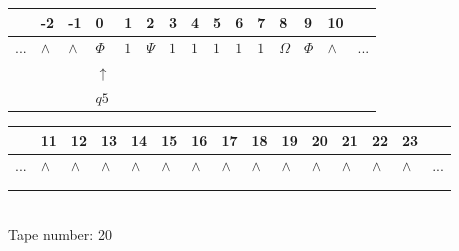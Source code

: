 \documentclass[11pt]{article}
\begin{document}
\begin{table}[H]
\centering
\begin{tabular}{lllllllllllllll}
 & -2 & -1 & 0 & 1 & 2 & 3 & 4 & 5 & 6 & 7 & 8 & 9 & 10 & \\
\hline
$...$ & \multicolumn{1}{|l|}{$\wedge$} & \multicolumn{1}{|l|}{$\wedge$} & \multicolumn{1}{|l|}{$\Phi$} & \multicolumn{1}{|l|}{$1$} & \multicolumn{1}{|l|}{$\Psi$} & \multicolumn{1}{|l|}{$1$} & \multicolumn{1}{|l|}{$1$} & \multicolumn{1}{|l|}{$1$} & \multicolumn{1}{|l|}{$1$} & \multicolumn{1}{|l|}{$1$} & \multicolumn{1}{|l|}{$\Omega$} & \multicolumn{1}{|l|}{$\Phi$} & \multicolumn{1}{|l|}{$\wedge$} & $...$\\
\hline
&  &  & $\uparrow$ &  &  &  &  &  &  &  &  &  &  &  \\
&  &  & $ q5 $ &  &  &  &  &  &  &  &  &  &  &  \\
\end{tabular}
\begin{tabular}{lllllllllllllll}
 & 11 & 12 & 13 & 14 & 15 & 16 & 17 & 18 & 19 & 20 & 21 & 22 & 23 & \\
\hline
$...$ & \multicolumn{1}{|l|}{$\wedge$} & \multicolumn{1}{|l|}{$\wedge$} & \multicolumn{1}{|l|}{$\wedge$} & \multicolumn{1}{|l|}{$\wedge$} & \multicolumn{1}{|l|}{$\wedge$} & \multicolumn{1}{|l|}{$\wedge$} & \multicolumn{1}{|l|}{$\wedge$} & \multicolumn{1}{|l|}{$\wedge$} & \multicolumn{1}{|l|}{$\wedge$} & \multicolumn{1}{|l|}{$\wedge$} & \multicolumn{1}{|l|}{$\wedge$} & \multicolumn{1}{|l|}{$\wedge$} & \multicolumn{1}{|l|}{$\wedge$} & $...$\\
\hline
&  &  &  &  &  &  &  &  &  &  &  &  &  &  \\
&  &  &  &  &  &  &  &  &  &  &  &  &  &  \\
\end{tabular}
\\
Tape number: 20
\noindent\makebox[\linewidth]{\hdashrule{\textwidth}{1pt}{1pt}}\end{table}
\end{document}
